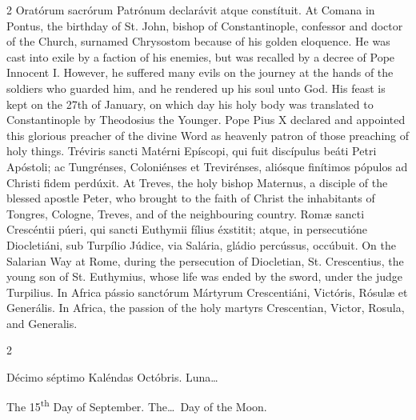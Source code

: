 \begin{paracol}{2}
 Oratórum sacrórum Patrónum declarávit atque constítuit.
\switchcolumn
{}
At Comana in Pontus, the birthday of 
 St. John, bishop of Constantinople, confessor and doctor of the Church, 
 surnamed Chrysostom because of his golden eloquence. He was cast into exile by a faction of his enemies, but was recalled by a decree of Pope 
 Innocent I. However, he suffered many evils on the journey at the 
 hands of the soldiers who guarded him, and he rendered up his soul unto God. 
 His feast is kept on the 27th of January, on which day his holy body was 
 translated to Constantinople by Theodosius the Younger. Pope Pius X 
 declared and appointed this glorious preacher of the divine Word as heavenly 
 patron of those preaching of holy things.
\switchcolumn*
{}
Tréviris sancti Matérni Epíscopi, qui fuit discípulus beáti Petri Apóstoli; ac Tungrénses, Coloniénses et Trevirénses, aliósque finítimos pópulos ad Christi fidem perdúxit.
\switchcolumn
{}
At Treves, the holy bishop Maternus, 
 a disciple of the blessed apostle Peter, who brought to the faith of Christ 
 the inhabitants of Tongres, Cologne, Treves, and of the neighbouring 
 country.
\switchcolumn*
{}
Romæ sancti Crescéntii 
 púeri, qui sancti Euthymii fílius éxstitit; atque, in persecutióne 
 Diocletiáni, sub Turpílio Júdice, via Salária, gládio percússus, occúbuit.
\switchcolumn
{}
On the Salarian Way at Rome, during 
 the persecution of Diocletian, St. Crescentius, the young son of St. 
 Euthymius, whose life was ended by the sword, under the judge Turpilius.
\switchcolumn*
{}
In Africa pássio 
 sanctórum Mártyrum Crescentiáni, Victóris, Rósulæ et Generális.
\switchcolumn
{}
In Africa, the passion of the holy 
 martyrs Crescentian, Victor, Rosula, and Generalis.
\switchcolumn*
{}
\end{paracol}


\begin{paracol}{2}
\begin{center}{\color{gregoriocolor} Décimo séptimo Kaléndas Octóbris. 
 Luna\dots\ }\end{center}
\switchcolumn
{}
\begin{center}{\color{gregoriocolor} The   15\textsuperscript{th} Day of 
 September. The\dots\ Day of the Moon.}\end{center}
\end{paracol}

